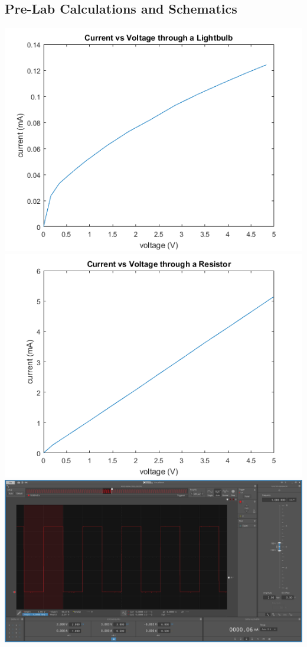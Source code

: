 \documentclass[10pt]{article}
\begin{document}
	\subsection{Pre-Lab Calculations and Schematics}
	\begin{center}
		\includegraphics[scale = 0.85]{supplemental/lightbulbgraph.png}
		\newline
		\includegraphics[scale = 0.85]{supplemental/resistorgraph.png}
		\newline
		\includegraphics[scale = 0.35]{supplemental/squarewave.png}
	\end{center}
\end{document}
